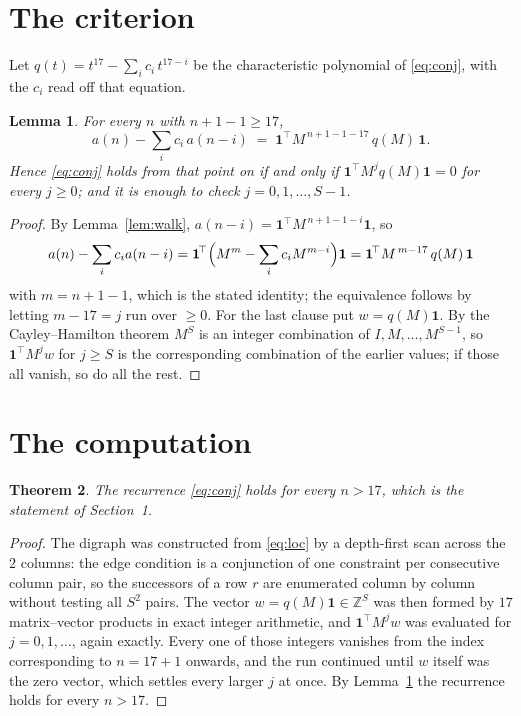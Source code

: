 \documentclass[11pt,a4paper]{article}
\theoremstyle{plain}
\newtheorem{theorem}{Theorem}
\newtheorem{lemma}[theorem]{Lemma}
\theoremstyle{definition}
\begin{document}
\section{The criterion}

Let $q(t)=t^{17}-\sum_i c_i\,t^{17-i}$ be the characteristic polynomial of
\eqref{eq:conj}, with the $c_i$ read off that equation.

\begin{lemma}\label{lem:crit}
For every $n$ with $n+1-1\ge17$,
\[
a(n)-\sum_i c_i\,a(n-i)\;=\;\mathbf{1}^{\!\top}M^{\,n+1-1-17}\,q(M)\,\mathbf{1} .
\]
Hence \eqref{eq:conj} holds from that point on if and only if
$\mathbf{1}^{\!\top}M^{j}q(M)\mathbf{1}=0$ for every $j\ge0$; and it is enough to check
$j=0,1,\dots,S-1$.
\end{lemma}

\begin{proof}
By Lemma~\ref{lem:walk}, $a(n-i)=\mathbf{1}^{\!\top}M^{\,n+1-1-i}\mathbf{1}$, so
\[
a(n)-\sum_i c_i a(n-i)
=\mathbf{1}^{\!\top}\Bigl(M^{m}-\sum_i c_i M^{m-i}\Bigr)\mathbf{1}
=\mathbf{1}^{\!\top}M^{\,m-17}\,q(M)\,\mathbf{1}
\]
with $m=n+1-1$, which is the stated identity; the equivalence follows by letting
$m-17=j$ run over $\ge0$. For the last clause put $w=q(M)\mathbf{1}$. By the
Cayley--Hamilton theorem $M^{S}$ is an integer combination of $I,M,\dots,M^{S-1}$, so
$\mathbf{1}^{\!\top}M^{j}w$ for $j\ge S$ is the corresponding combination of the earlier
values; if those all vanish, so do all the rest.
\end{proof}

\section{The computation}

\begin{theorem}
The recurrence \eqref{eq:conj} holds for every $n>17$, which is the statement of
Section~1.
\end{theorem}

\begin{proof}
The digraph was constructed from \eqref{eq:loc} by a depth-first scan across the $2$
columns: the edge condition is a conjunction of one constraint per consecutive column
pair, so the successors of a row $r$ are enumerated column by column without testing all
$S^2$ pairs. The vector $w=q(M)\mathbf{1}\in\mathbb{Z}^{S}$ was then formed by $17$
matrix--vector products in exact integer arithmetic, and $\mathbf{1}^{\!\top}M^{j}w$ was
evaluated for $j=0,1,\dots$, again exactly. Every one of those integers vanishes from the
index corresponding to $n=17+1$ onwards, and the run continued until $w$ itself was the
zero vector, which settles every larger $j$ at once. By Lemma~\ref{lem:crit} the recurrence
holds for every $n>17$.
\end{proof}
\end{document}
